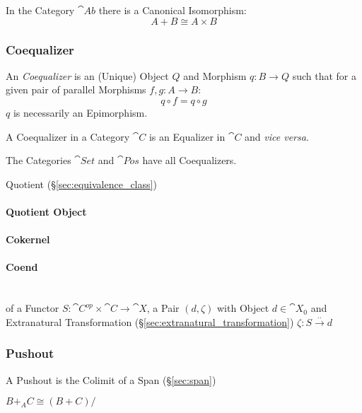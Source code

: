 In the Category $\cat{Ab}$ there is a Canonical
Isomorphism:\cite{awodey06}
\[
  A + B \cong A \times B
\]



\subsubsection{Coequalizer}\label{sec:coequalizer}

An \emph{Coequalizer} is an (Unique) Object $Q$ and Morphism $q: B
\rightarrow Q$ such that for a given pair of parallel Morphisms $f,g :
A \rightarrow B$:
\[
  q \circ f = q \circ g
\]
$q$ is necessarily an Epimorphism.

A Coequalizer in a Category $\cat{C}$ is an Equalizer in
$\cat{C}$ and \emph{vice versa}.

The Categories $\cat{Set}$ and $\cat{Pos}$ have all
Coequalizers.

Quotient (\S\ref{sec:equivalence_class})



\paragraph{Quotient Object}\label{sec:quotient_object}

\paragraph{Cokernel}\label{sec:cokernel}

\paragraph{Coend}\label{sec:coend}
\hfill \\

of a Functor $S : \cat{C}^{op} \times \cat{C} \rightarrow
\cat{X}$, a Pair $(d, \zeta)$ with Object $d \in \cat{X}_0$ and
Extranatural Transformation (\S\ref{sec:extranatural_transformation})
$\zeta : S \xrightarrow{..} d$



\subsubsection{Pushout}\label{sec:pushout}

A Pushout is the Colimit of a Span (\S\ref{sec:span})

$B +_A C \cong (B + C)/~$



